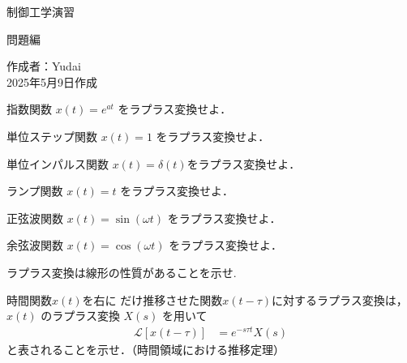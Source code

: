 \documentclass[a4paper,12pt]{article}
\begin{document}
\begin{titlepage}
    \centering
    \vspace*{2cm}
    {\LARGE {制御工学演習} \par}
    \vspace{1cm}
    {\Large 問題編 \par}
    \vfill
    \begin{flushright}
      \large
      作成者：Yudai\\
      2025年5月9日作成
    \end{flushright}
\end{titlepage}

\noindent
[1] 指数関数 \(x(t) =e^{at}\) をラプラス変換せよ．\\
\vspace{10mm}


\noindent
[2] 単位ステップ関数 \( x(t) = 1 \) をラプラス変換せよ．\\
\vspace{10mm}


\noindent
[3] 単位インパルス関数 \( x(t) = \delta(t) \)をラプラス変換せよ．\\
\vspace{10mm}


\noindent
[4] ランプ関数 \( x(t) = t \) をラプラス変換せよ．\\
\vspace{10mm}


\noindent
[5] 正弦波関数 \( x(t) = \sin(\omega t) \) をラプラス変換せよ．\\
\vspace{10mm}


\noindent
[6] 余弦波関数 \( x(t) = \cos(\omega t) \) をラプラス変換せよ．\\
\vspace{10mm}


\noindent
[7] ラプラス変換は線形の性質があることを示せ. \\
\vspace{10mm}


\noindent
[8] 時間関数\( x(t) \)を右に \tau だけ推移させた関数\( x(t - \tau) \)に対するラプラス変換は，\\
\quad \( x(t) \) のラプラス変換 \( X(s)\) を用いて 
\vspace{-2mm}
\begin{align*}
    \mathcal{L} \left[ x(t - \tau) \right] &=
    e^{-s
    \tau t}X(s)
\end{align*}
\quad と表されることを示せ．（時間領域における推移定理）\\
\vspace{10mm}
\end{document}
